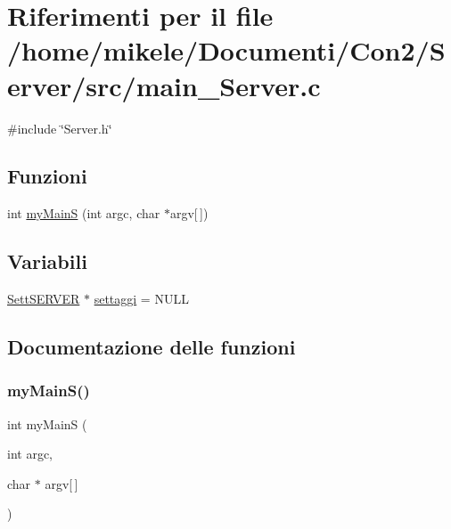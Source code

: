 \hypertarget{a00029}{}\section{Riferimenti per il file /home/mikele/\+Documenti/\+Con2/\+Server/src/main\+\_\+\+Server.c}
\label{a00029}
{\ttfamily \#include \char`\"{}Server.\+h\char`\"{}}\newline
\subsection*{Funzioni}
\begin{DoxyCompactItemize}
\item 
int \mbox{\hyperlink{a00029_a77c974b2a79a9a1413f9ce1fb1e1a69a}{my\+MainS}} (int argc, char $\ast$argv\mbox{[}$\,$\mbox{]})
\end{DoxyCompactItemize}
\subsection*{Variabili}
\begin{DoxyCompactItemize}
\item 
\mbox{\hyperlink{a00050_a2ae1b7622ac02fc56c93b1f3911fbd76}{Sett\+S\+E\+R\+V\+ER}} $\ast$ \mbox{\hyperlink{a00029_a9ea2d4cbc5355102c58960d512b000fc}{settaggi}} = N\+U\+LL
\end{DoxyCompactItemize}


\subsection{Documentazione delle funzioni}
\mbox{\label{a00029_a77c974b2a79a9a1413f9ce1fb1e1a69a}} 
\subsubsection{\texorpdfstring{myMainS()}{myMainS()}}
{\footnotesize\ttfamily int my\+MainS (\begin{DoxyParamCaption}\item[{int}]{argc,  }\item[{char $\ast$}]{argv\mbox{[}$\,$\mbox{]} }\end{DoxyParamCaption})}



